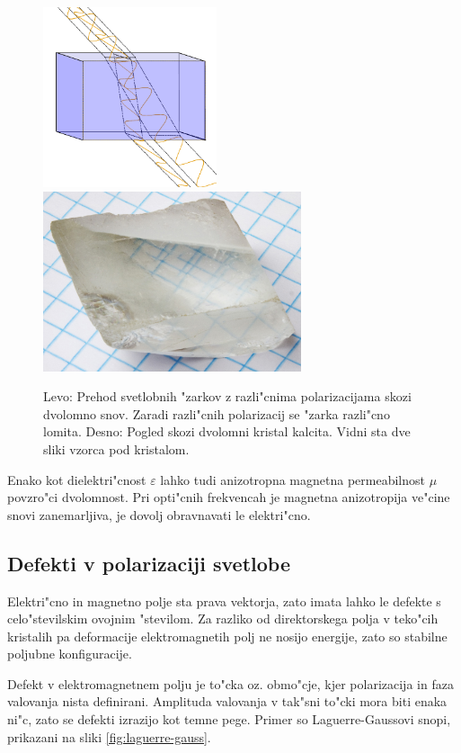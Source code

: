 \documentclass[a4paper,10pt]{article}
\begin{document}
\begin{figure}[h]
  \centering
  \includegraphics[height=150pt]{./Slike/Rays_passing_through_birefringent_material}
  \includegraphics[height=150pt]{./Slike/Crystal_on_graph_paper}
  \caption{Levo: Prehod svetlobnih "zarkov z razli"cnima polarizacijama skozi dvolomno snov. 
Zaradi razli"cnih polarizacij se "zarka razli"cno lomita. Desno: Pogled skozi dvolomni kristal kalcita. Vidni sta dve sliki vzorca pod kristalom. \cite{wiki:birefringence}}
  \label{fig:dvolomnost}
\end{figure}


Enako kot dielektri"cnost $\varepsilon$ lahko tudi anizotropna magnetna permeabilnost $\mu$ povzro"ci dvolomnost. 
Pri opti"cnih frekvencah je magnetna anizotropija ve"cine snovi zanemarljiva, je dovolj obravnavati le elektri"cno. 

\subsection{Defekti v polarizaciji svetlobe}
Elektri"cno in magnetno polje sta prava vektorja, zato imata lahko le defekte s celo"stevilskim ovojnim "stevilom. 
Za razliko od direktorskega polja v teko"cih kristalih pa deformacije elektromagnetih polj ne nosijo energije, zato so stabilne poljubne konfiguracije. 

Defekt v elektromagnetnem polju je to"cka oz. obmo"cje, kjer polarizacija in faza valovanja nista definirani. 
Amplituda valovanja v tak"sni to"cki mora biti enaka ni"c, zato se defekti izrazijo kot temne pege. 
Primer so Laguerre-Gaussovi snopi, prikazani na sliki \ref{fig:laguerre-gauss}. 
\end{document}
